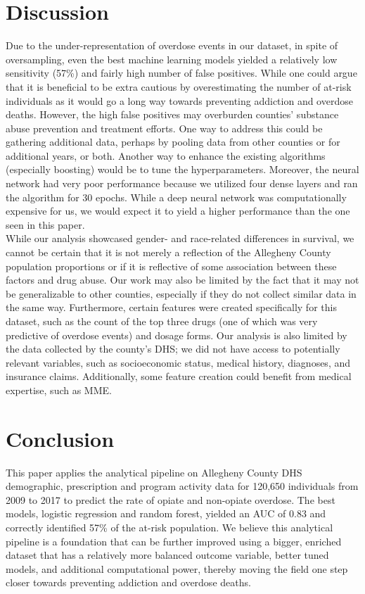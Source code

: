 \documentclass[twoside,10.5pt]{article}
\begin{document}
\section{Discussion}
Due to the under-representation of overdose events in our dataset, in spite of oversampling, even the best machine learning models yielded a relatively low sensitivity (57\%) and fairly high number of false positives. While one could argue that it is beneficial to be extra cautious by overestimating the number of at-risk individuals as it would go a long way towards preventing addiction and overdose deaths. However, the high false positives may overburden counties' substance abuse prevention and treatment efforts. One way to address this could be gathering additional data, perhaps by pooling data from other counties or for additional years, or both. Another way to enhance the existing algorithms (especially boosting) would be to tune the hyperparameters. Moreover, the neural network had very poor performance because we utilized four dense layers and ran the algorithm for 30 epochs. While a deep neural network was computationally expensive for us, we would expect it to yield a higher performance than the one seen in this paper. \\

While our analysis showcased gender- and race-related differences in survival, we cannot be certain that it is not merely a reflection of the Allegheny County population proportions or if it is reflective of some association between these factors and drug abuse. Our work may also be limited by the fact that it may not be generalizable to other counties, especially if they do not collect similar data in the same way. Furthermore, certain features were created specifically for this dataset, such as the count of the top three drugs (one of which was very predictive of overdose events) and dosage forms. Our analysis is also limited by the data collected by the county's DHS; we did not have access to potentially relevant variables, such as socioeconomic status, medical history, diagnoses, and insurance claims. Additionally, some feature creation could benefit from medical expertise, such as MME. 

\section{Conclusion}
This paper applies the analytical pipeline on Allegheny County DHS demographic, prescription and program activity data for 120,650 individuals from 2009 to 2017 to predict the rate of opiate and non-opiate overdose. The best models, logistic regression and random forest, yielded an AUC of 0.83 and correctly identified 57\% of the at-risk population. We believe this analytical pipeline is a foundation that can be further improved using a bigger, enriched dataset that has a relatively more balanced outcome variable, better tuned models, and additional computational power, thereby moving the field one step closer towards preventing addiction and overdose deaths.
\end{document}
